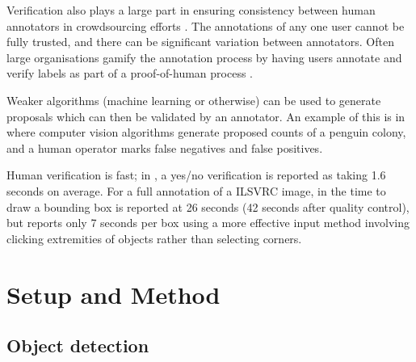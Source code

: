 \documentclass[conference]{IEEEtran}
\begin{document}
Verification also plays a large part in ensuring consistency between human annotators in crowdsourcing efforts \cite{Su2012a}. The annotations of any one user cannot be fully trusted, and there can be significant variation between annotators. Often large organisations gamify the annotation process by having users annotate and verify labels as part of a proof-of-human process \cite{von2008recaptcha}.

Weaker algorithms (machine learning or otherwise) can be used to generate proposals which can then be validated by an annotator. An example of this is in \cite{McNeill2011} where computer vision algorithms generate proposed counts of a penguin colony, and a human operator marks false negatives and false positives.

Human verification is fast; in \cite{Papadopoulos2016}, a yes/no verification is reported as taking 1.6 seconds on average. For a full annotation of a \gls{ILSVRC} image, in \cite{Su2012a} the time to draw a bounding box is reported at 26 seconds (42 seconds after quality control), but \cite{Papadopoulos2017} reports only 7 seconds per box using a more effective input method involving clicking extremities of objects rather than selecting corners. 

\section {Setup and Method}
\subsection {Object detection}
\end{document}
